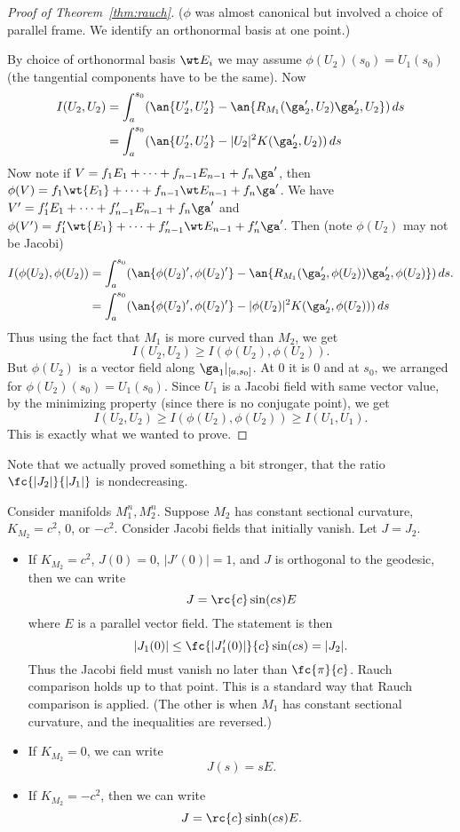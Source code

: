 \begin{proof}[Proof of Theorem~\ref{thm:rauch}]
($\phi$ was almost canonical but involved a choice of parallel frame. We identify an orthonormal basis at one point.)

By choice of orthonormal basis $\wt E_i$ we may assume $\phi(U_2)(s_0)=U_1(s_0)$ (the tangential components have to be the same). %
Now
\begin{align*}
I(U_2,U_2)&=\int_a^{s_0} (\an{U_2',U_2'}-\an{R_{M_1}(\ga_2',U_2)\ga_2',U_2})\,ds\\
&=\int_a^{s_0} (\an{U_2',U_2'}-|U_2|^2K(\ga_2',U_2))\,ds
\end{align*}
Now note if $V=f_1E_1+\cdots +f_{n-1}E_{n-1}+f_n\ga'$, then $\phi(V)=f_1\wt{E_1}+\cdots +f_{n-1}\wt E_{n-1}+f_n\ga'$. We have $V'=f_1'E_1+\cdots +f_{n-1}'E_{n-1}+f_n\ga'$ and $\phi(V')=f_1'\wt{E_1}+\cdots +f_{n-1}'\wt E_{n-1}+f_n'\ga'$. Then (note $\phi(U_2)$ may not be Jacobi)
\begin{align*}
I(\phi(U_2),\phi(U_2))&=\int_a^{s_0} (\an{\phi(U_2)',\phi(U_2)'}-\an{R_{M_1}(\ga_2',\phi(U_2))\ga_2',\phi(U_2)})\,ds.\\
&=\int_a^{s_0} (\an{\phi(U_2)',\phi(U_2)'}-|\phi(U_2)|^2K(\ga_2',\phi(U_2)))\,ds
\end{align*}
Thus using the fact that $M_1$ is more curved than $M_2$, we get
\[
I(U_2,U_2)\ge I(\phi(U_2),\phi(U_2)).
\]
But $\phi(U_2)$ is a vector field along $\ga_1|_{[a,s_0]}$. At 0 it is 0 and at $s_0$, we arranged for $\phi(U_2)(s_0)=U_1(s_0)$. Since $U_1$ is a Jacobi field with same vector value, by the minimizing property (since there is no conjugate point), we get
\[
I(U_2,U_2)\ge I(\phi(U_2),\phi(U_2))\ge I(U_1,U_1).
\]
This is exactly what we wanted to prove.
\end{proof}
Note that we actually proved something a bit stronger, that the ratio $\fc{|J_2|}{|J_1|}$ is nondecreasing.

\begin{ex}
Consider manifolds $M_1^n, M_2^n$. Suppose $M_2$ has constant sectional curvature, $K_{M_2}=c^2$, $0$, or $-c^2$. Consider Jacobi fields that initially vanish. Let $J=J_2$.
\begin{itemize}
\item
If $K_{M_2}=c^2$, $J(0)=0$, $|J'(0)|=1$, and $J$ is orthogonal to the geodesic, then we can write
\[J=\rc{c}\sin(cs)E\]
where $E$ is a parallel vector field.
The statement is then
\[
|J_1(0)|\le \fc{|J_1'(0)|}{c}\sin(cs)=|J_2|.
\]
Thus the Jacobi field must vanish no later than $\fc{\pi}{c}$. Rauch comparison holds up to that point. This is a standard way that Rauch comparison is applied. (The other is when $M_1$ has constant sectional curvature, and the inequalities are reversed.)
\item
If $K_{M_2}=0$, we can write
\[
J(s)=sE.
\]
\item
If $K_{M_2}=-c^2$, then we can write
\[
J=\rc{c} \sinh(cs)E.
\]
\end{itemize}
\end{ex}